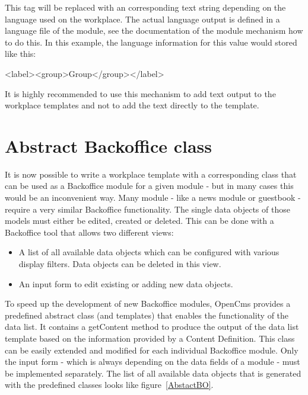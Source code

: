 This tag will be replaced with an corresponding text string depending on
the language used on the workplace. The actual language output is
defined in a language file of the module, see the documentation of the
module mechanism how to do this. In this example, the language
information for this value would stored like this:
\begin{java}
<label><group>Group</group></label>\\
\end{java}
It is highly recommended to use this mechanism to add text output to the
workplace templates and not to add the text directly to the template.

\section {Abstract Backoffice class}
It is now possible to write a workplace template with a corresponding
class that can be used as a Backoffice module for a given module - but
in many cases this would be an inconvenient way. Many module - like a
news module or guestbook -  require a very similar Backoffice
functionality. The single data objects of those models must either be
edited, created or deleted. This can be done with a Backoffice tool
that allows two different views:

\begin{itemize}
\item A list of all available data objects which can be configured
with various display filters. Data objects can be deleted in this view.
       
\item An input form to edit existing or adding new data objects.
\end{itemize}

To speed up the development of new Backoffice modules, OpenCms provides
a predefined abstract class (and templates) that enables the
functionality of the data list.  It contains a {\meth getContent} method to
produce the output of the data list template based on the information
provided by a Content Definition. This class can be easily extended and
modified for each individual Backoffice module. Only the input form -
which is always depending on the data fields of a module - must be
implemented separately. The list of all available data objects that is
generated with the predefined classes looks like figure~\ref{AbstactBO}.

